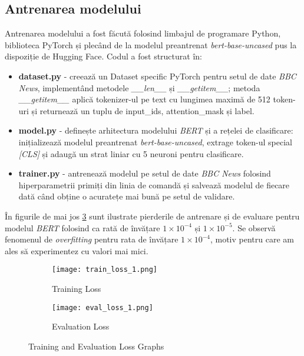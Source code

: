 \subsection{Antrenarea modelului}
\vspace{1em}
Antrenarea modelului a fost făcută folosind limbajul de programare Python, biblioteca PyTorch \cite{paszke2019pytorch}
și plecând de la modelul preantrenat \textit{bert-base-uncased} pus la dispoziție de Hugging Face.
Codul a fost structurat în: 
\vspace{1em}

\begin{itemize}
    \item \textbf{dataset.py} - creează un Dataset specific PyTorch pentru setul de date \textit{BBC News},
    implementând metodele \textit{\_\_len\_\_} și \textit{\_\_getitem\_\_}; metoda \textit{\_\_getitem\_\_}
    aplică tokenizer-ul pe text cu lungimea maximă de 512 token-uri și returnează un tuplu de input\_ids,
    attention\_mask și label.
    \item \textbf{model.py} - definește arhitectura modelului \textit{BERT} și a rețelei de clasificare:
    inițializează modelul preantrenat \textit{bert-base-uncased}, extrage token-ul special \textit{[CLS]}
    și adaugă un strat liniar cu 5 neuroni pentru clasificare.
    \item \textbf{trainer.py} - antrenează modelul pe setul de date \textit{BBC News} folosind
    hiperparametrii primiți din linia de comandă și salvează modelul de fiecare dată când obține o
    acuratețe mai bună pe setul de validare.
\end{itemize}

\vspace{1em}

\par
În figurile de mai jos \ref{fig:loss_graphs} sunt ilustrate pierderile de antrenare și de evaluare pentru modelul \textit{BERT}
folosind ca rată de învățare $1 \times 10^{-4}$ și $1 \times 10^{-5}$. Se observă fenomenul de \textit{overfitting}
pentru rata de învățare $1 \times 10^{-4}$, motiv pentru care am ales să experimentez cu valori mai mici.

\begin{figure}[ht]
    \centering
    \begin{subfigure}[b]{0.45\textwidth}
        \texttt{[image: train\_loss\_1.png]}
        \caption{Training Loss}
        \label{fig:train_loss}
    \end{subfigure}
    \hfill %
    \begin{subfigure}[b]{0.45\textwidth}
        \texttt{[image: eval\_loss\_1.png]}
        \caption{Evaluation Loss}
        \label{fig:eval_loss}
    \end{subfigure}
    \caption{Training and Evaluation Loss Graphs}
    \label{fig:loss_graphs}
\end{figure}
\vspace{1em}

